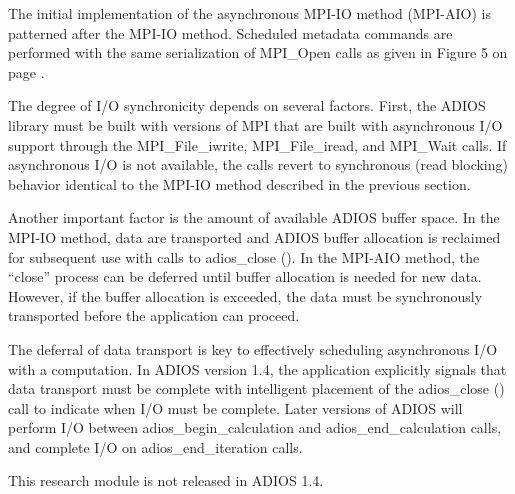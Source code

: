 \vspace{10pt}
The initial implementation of the asynchronous MPI-IO method (MPI-AIO) is patterned 
after the MPI-IO method. Scheduled metadata commands are performed with the same 
serialization of MPI\_Open calls as given in Figure 5 on page \pageref{HRef140744843}.

\vspace{10pt}
The degree of I/O synchronicity depends on several factors. First, the ADIOS library 
must be built with versions of MPI that are built with asynchronous I/O support 
through the MPI\_File\_iwrite, MPI\_File\_iread, and MPI\_Wait calls. If asynchronous 
I/O is not available, the calls revert to synchronous (read blocking) behavior 
identical to the MPI-IO method described in the previous section. 

\vspace{10pt}
Another important factor is the amount of available ADIOS buffer space. In the 
MPI-IO method, data are transported and ADIOS buffer allocation is reclaimed for 
subsequent use with calls to adios\_close (). In the MPI-AIO method, the ``close'' 
process can be deferred until buffer allocation is needed for new data. However, 
if the buffer allocation is exceeded, the data must be synchronously transported 
before the application can proceed.

\vspace{10pt}
The deferral of data transport is key to effectively scheduling asynchronous I/O 
with a computation. In ADIOS version 1.4, the application explicitly signals that 
data transport must be complete with intelligent placement of the adios\_close 
() call to indicate when I/O must be complete. Later versions of ADIOS will perform 
I/O between adios\_begin\_calculation and adios\_end\_calculation calls, and complete 
I/O on adios\_end\_iteration calls.

\vspace{10pt}
This research module is not released in ADIOS 1.4.\label{HRef118286941}\label{HToc84890268}\label{HToc212016644}\label{HToc212016886}\label{HToc182553396}
